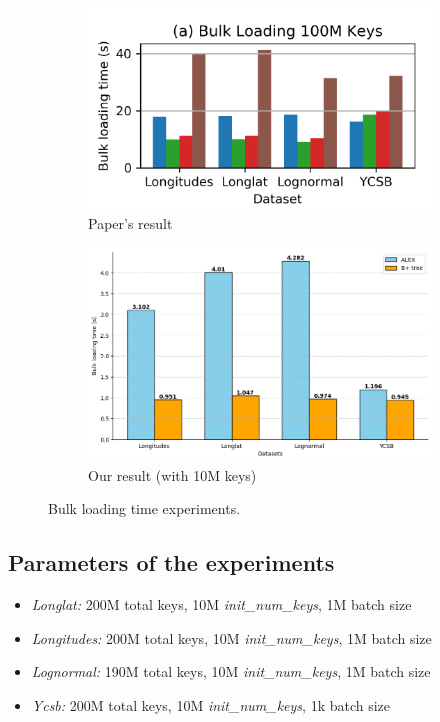 \documentclass[12pt,a4paper]{article}
\begin{document}
\begin{figure}[htbp]
    \centering

    \begin{subfigure}{0.3\textwidth}
        \includegraphics[width=\linewidth]{Figures/bulk loading time.png}
        \caption{Paper's result}
    \end{subfigure}
    \begin{subfigure}{0.3\textwidth}
        \includegraphics[width=\linewidth]{Figures/Bulkloadingtime (1).png }
        \caption{Our result (with 10M keys)}
    \end{subfigure}
  

    \caption{Bulk loading time experiments.}
\end{figure}


\subsection{Parameters of the experiments}
\begin{itemize}
    \item \textit{Longlat:} 200M total keys, 10M \textit{init\_num\_keys}, 1M batch size
    \item \textit{Longitudes:} 200M total keys, 10M \textit{init\_num\_keys}, 1M batch size
    \item \textit{Lognormal:} 190M total keys, 10M \textit{init\_num\_keys}, 1M batch size
    \item \textit{Ycsb:} 200M total keys, 10M \textit{init\_num\_keys}, 1k batch size
\end{itemize}
\end{document}
